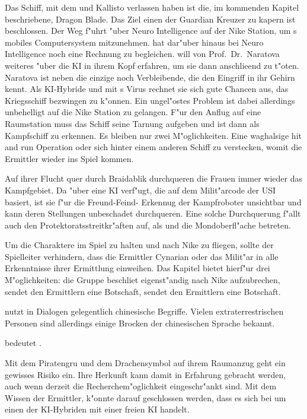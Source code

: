 \begin{remarks}
	Das Schiff, mit dem \xl{} und \ml{} Kallisto verlassen haben ist die, im kommenden Kapitel beschriebene, Dragon Blade. Das Ziel einen der Guardian Kreuzer zu kapern ist beschlossen. Der Weg f"uhrt "uber Neuro Intelligence auf der Nike Station, um \ml{}s mobiles Computersystem mitzunehmen. \xl{} hat dar"uber hinaus bei Neuro Intelligence noch eine Rechnung zu begleichen. \xl{} will von Prof.~Dr.~Naratova weiteres "uber die KI in ihrem Kopf erfahren, um sie dann anschlie\3end zu t"oten. Naratova ist neben \ml{} die einzige noch Verbleibende, die den Eingriff in ihr Gehirn kennt. Als KI-Hybride und mit \ml{}s Virus rechnet sie sich gute Chancen aus, das Kriegsschiff bezwingen zu k"onnen. Ein ungel"ostes Problem ist dabei allerdings unbehelligt auf die Nike Station zu gelangen. F"ur den Anflug auf eine Raumstation muss das Schiff seine Tarnung aufgeben und ist dann als Kampfschiff zu erkennen. Es bleiben nur zwei M"oglichkeiten. Eine waghalsige hit and run Operation oder sich hinter einem anderen Schiff zu verstecken, womit die Ermittler wieder ins Spiel kommen.

	Auf ihrer Flucht quer durch Braidablik durchqueren die Frauen immer wieder das Kampfgebiet. Da \xl{} "uber eine KI verf"ugt, die auf dem Milit"arcode der USI basiert, ist sie f"ur die Freund-Feind- Erkennug der Kampfroboter unsichtbar und kann deren Stellungen unbeschadet durchqueren. Eine solche Durchquerung f"allt auch den Protektoratsstreitkr"aften auf, als \xl{} und \ml{} die Mondoberfl"ache betreten. 

	Um die Charaktere im Spiel zu halten und nach Nike zu fliegen, sollte der Spielleiter verhindern, dass die Ermittler Cynarian oder das Milit"ar in alle Erkenntnisse ihrer Ermittlung einweihen. Das Kapitel bietet hierf"ur drei M"oglichkeiten: die Gruppe beschlie\3t eigenst"andig nach Nike aufzubrechen, \xl{} sendet den Ermittlern eine Botschaft, \ml{} sendet den Ermittlern eine Botschaft.

	\xl{} nutzt in Dialogen gelegentlich chinesische Begriffe. Vielen extraterrestrischen Personen sind allerdings einige Brocken der chinesischen Sprache bekannt. 
	
	 bedeutet .

	Mit dem Piratengru\3 und dem Drachensymbol auf ihrem Raumanzug geht \xl{} ein gewisses Risiko ein. Ihre Herkunft kann damit in Erfahrung gebracht werden, auch wenn derzeit die Recherchem"oglichkeit eingeschr"ankt sind. Mit dem Wissen der Ermittler, k"onnte darauf geschlossen werden, dass es sich bei \xl{} um einen der KI-Hybriden mit einer freien KI handelt.
\end{remarks}
\vfill